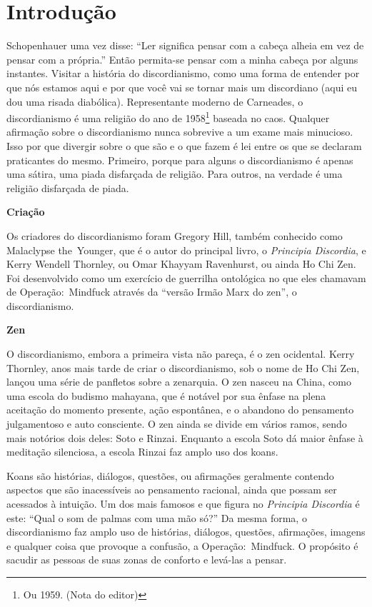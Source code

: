 \newpage
\chapter*{Introdução}

Schopenhauer uma vez disse: ``Ler significa pensar com a cabeça alheia em vez de pensar com a própria.'' Então per\-mi\-ta-se pensar com a minha cabeça por alguns instantes. Visitar a história do discordianismo, como uma forma de entender por que nós estamos aqui e por que você vai se tornar mais um discordiano (aqui eu dou uma risada diabólica). Representante moderno de Carneades, o discordianismo é uma religião do ano de 1958\footnote{Ou 1959. (Nota do editor)} baseada no caos. Qualquer afirmação sobre o discordianismo nunca sobrevive a um exame mais minucioso. Isso por que divergir sobre o que são e o que fazem é lei entre os que se declaram praticantes do mesmo. Primeiro, porque para alguns o discordianismo é apenas uma sátira, uma piada disfarçada de religião. Para outros, na verdade é uma religião disfarçada de piada.
 
\begin{flushleft}
{\Large \textbf{Criação}}
\end{flushleft}

Os criadores do discordianismo foram Gregory Hill, também conhecido como Malaclypse the~Younger, que é o autor do principal livro, o \emph{Principia Discordia}, e Kerry Wendell Thornley, ou Omar Khayyam Ravenhurst, ou ainda Ho Chi Zen. Foi desenvolvido como um exercício de guerrilha ontológica no que eles chamavam de Operação:~Mindfuck através da ``versão Irmão Marx do zen'', o discordianismo.

\begin{flushleft}
{\Large \textbf{Zen}}
\end{flushleft}

O discordianismo, embora a primeira vista não pareça, é o zen ocidental. Kerry Thornley, anos mais tarde de criar o discordianismo, sob o nome de Ho Chi Zen, lançou uma série de panfletos sobre a zenarquia. O zen nasceu na China, como uma escola do budismo mahayana, que é notável por sua ênfase na plena aceitação do momento presente, ação espontânea, e o abandono do pensamento julgamentoso e auto consciente. O zen ainda se divide em vários ramos, sendo mais notórios dois deles: Soto e Rinzai. Enquanto a escola Soto dá maior ênfase à meditação silenciosa, a escola Rinzai faz amplo uso dos koans.

Koans são histórias, diálogos, questões, ou afirmações geralmente contendo aspectos que são inacessíveis ao pensamento racional, ainda que possam ser acessados à intuição. Um dos mais famosos e que figura no \emph{Principia Discordia} é este: ``Qual o som de palmas com uma mão só?'' Da mesma forma, o discordianismo faz amplo uso de histórias, diálogos, questões, afirmações, imagens e qualquer coisa que provoque a confusão, a Operação:~Mindfuck. O propósito é sacudir as pessoas de suas zonas de conforto e levá-las a pensar.

